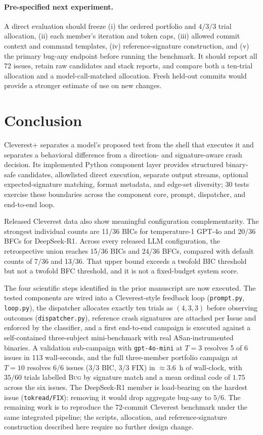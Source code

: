 \documentclass{article}
\begin{document}
\paragraph{Pre-specified next experiment.}
A direct evaluation should freeze (i) the ordered portfolio and $4/3/3$ trial
allocation, (ii) each member's iteration and token caps, (iii) allowed commit
context and command templates, (iv) reference-signature construction, and (v)
the primary bug-any endpoint before running the benchmark.  It should report
all 72 issues, retain raw candidates and stack reports, and compare both a
ten-trial allocation and a model-call-matched allocation.  Fresh held-out
commits would provide a stronger estimate of use on new changes.

\section{Conclusion}
\label{sec:conclusion}

Cleverest+ separates a model's proposed test from the shell that executes it
and separates a behavioral difference from a direction- and signature-aware
crash decision.  Its implemented Python component layer provides structured
binary-safe candidates, allowlisted direct execution, separate output streams,
optional expected-signature matching, format metadata, and edge-set diversity;
30 tests exercise these boundaries across the component core, prompt,
dispatcher, and end-to-end loop.

Released Cleverest data also show meaningful configuration complementarity.
The strongest individual counts are 11/36 BICs for temperature-1 GPT-4o and
20/36 BFCs for DeepSeek-R1.  Across every released LLM configuration, the
retrospective union reaches 15/36 BICs and 24/36 BFCs, compared with default
counts of 7/36 and 13/36.  That upper bound exceeds a twofold BIC threshold but
not a twofold BFC threshold, and it is not a fixed-budget system score.

The four scientific steps identified in the prior manuscript are now
executed. The tested components are wired into a Cleverest-style feedback
loop (\texttt{prompt.py}, \texttt{loop.py}), the dispatcher allocates
exactly ten trials as $(4,3,3)$ before observing outcomes
(\texttt{dispatcher.py}), reference crash signatures are attached per Issue
and enforced by the classifier, and a first end-to-end campaign is executed
against a self-contained three-subject mini-benchmark with real
ASan-instrumented binaries. A validation sub-campaign with
\texttt{gpt-4o-mini} at $T{=}3$ resolves 5 of 6 issues in 113 wall-seconds,
and the full three-member portfolio campaign at $T{=}10$ resolves $6/6$
issues (3/3 BIC, 3/3 FIX) in $\approx 3.6$~h of wall-clock, with $35/60$
trials labelled \textsc{Bug} by signature match and a mean ordinal code of
$1.75$ across the six issues.  The DeepSeek-R1 member is load-bearing on
the hardest issue (\texttt{tokread/FIX}): removing it would drop aggregate
bug-any to $5/6$.  The remaining work is to reproduce the 72-commit
Cleverest benchmark under the same integrated pipeline; the scripts,
allocation, and reference-signature construction described here require
no further design change.
\end{document}
